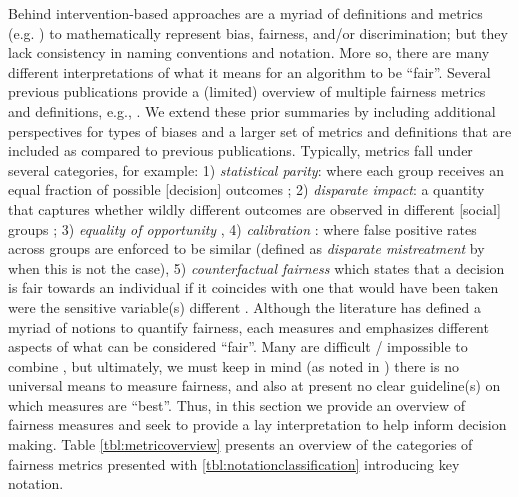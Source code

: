 \label{sec:metrics}
Behind intervention-based approaches are a myriad of definitions and metrics (e.g. ) to mathematically represent bias, fairness, and/or discrimination; but they lack consistency in naming conventions  and notation. More so, there are many different interpretations of what it means for an algorithm to be ``fair''. Several previous publications provide a (limited) overview of multiple fairness metrics and definitions, e.g., . We extend these prior summaries by including additional perspectives for types of biases and a larger set of metrics and definitions that are included as compared to previous publications.
Typically, metrics fall under several categories, for example: 1) \emph{statistical parity}: where each group receives an equal fraction of possible [decision] outcomes ; 2) \emph{disparate impact}: a quantity that captures whether wildly different outcomes are observed in different [social] groups ; 3) \emph{equality of opportunity} , 4) \emph{calibration} : where false positive rates across groups are enforced to be similar (defined as \emph{disparate mistreatment} by  when this is not the case), 5) \emph{counterfactual fairness} which states that a decision is fair towards an individual if it coincides with one that would have been taken were the sensitive variable(s) different . 
Although the literature has defined a myriad of notions to quantify fairness, each measures and emphasizes different aspects of what can be considered ``fair''. Many are difficult / impossible to combine , but ultimately, we must keep in mind (as noted in ) there is no universal means to measure fairness, and also at present no clear guideline(s) on which measures are ``best''. Thus, in this section we provide an overview of fairness measures and seek to provide a lay interpretation to help inform decision making. Table \ref{tbl:metricoverview} presents an overview of the categories of fairness metrics presented with \autoref{tbl:notationclassification} introducing key notation. 
